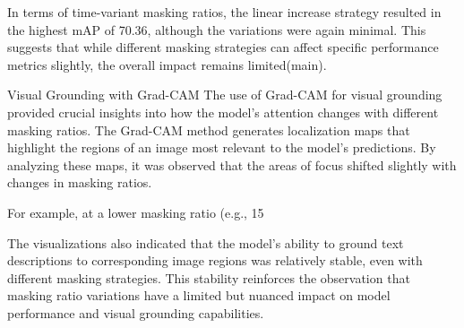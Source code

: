 In terms of time-variant masking ratios, the linear increase strategy resulted in the highest mAP of 70.36, although the variations were again minimal. This suggests that while different masking strategies can affect specific performance metrics slightly, the overall impact remains limited​(main)​.

Visual Grounding with Grad-CAM
The use of Grad-CAM for visual grounding provided crucial insights into how the model's attention changes with different masking ratios. The Grad-CAM method generates localization maps that highlight the regions of an image most relevant to the model's predictions. By analyzing these maps, it was observed that the areas of focus shifted slightly with changes in masking ratios.

For example, at a lower masking ratio (e.g., 15%

The visualizations also indicated that the model's ability to ground text descriptions to corresponding image regions was relatively stable, even with different masking strategies. This stability reinforces the observation that masking ratio variations have a limited but nuanced impact on model performance and visual grounding capabilities.





